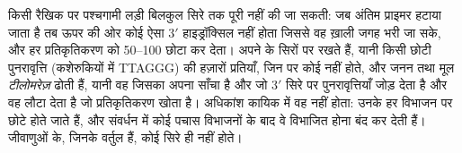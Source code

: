 \begin{proposition}\label{prop:b1:replication-mitosis:telomerase}
किसी रैखिक  पर पश्चगामी लड़ी बिलकुल सिरे तक पूरी नहीं की जा
सकती: जब अंतिम प्राइमर हटाया जाता है तब ऊपर की ओर कोई ऐसा $3'$
हाइड्रॉक्सिल नहीं होता जिससे वह ख़ाली जगह भरी जा सके, और हर
प्रतिकृतिकरण  को \qtyrange{50}{100}{}  छोटा कर
देता।  अपने  के सिरों पर \emph{} रखते हैं,
यानी किसी छोटी पुनरावृत्ति (कशेरुकियों में TTAGGG) की हज़ारों प्रतियाँ,
जिन पर कोई  नहीं होते, और जनन  तथा मूल 
\emph{टीलोमरेज़} ढोती हैं, यानी वह  जिसका अपना  साँचा है और जो
$3'$ सिरे पर पुनरावृत्तियाँ जोड़ देता है और वह लौटा देता है जो
प्रतिकृतिकरण खोता है। अधिकांश कायिक  में वह नहीं होता: उनके
 हर विभाजन पर छोटे होते जाते हैं, और संवर्धन में कोई पचास विभाजनों
के बाद वे विभाजित होना बंद कर देती हैं। जीवाणुओं के, जिनके  वर्तुल
हैं, कोई सिरे ही नहीं होते।
\end{proposition}

